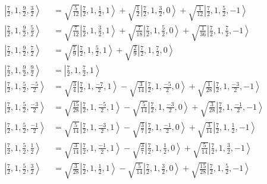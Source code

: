\documentclass{report}
\newcommand{\ket}[1]{\left| #1 \right>} %
\begin{document}
\begin{align*}
\ket{ \frac{7}{2} ,  1 ,  \frac{9}{2} ,  \frac{3}{2}  } &=  \sqrt{  \frac{5}{12}  } \ket{ \frac{7}{2} ,  1 ,  \frac{1}{2} ,  1  } + \sqrt{  \frac{1}{2}  } \ket{ \frac{7}{2} ,  1 ,  \frac{3}{2} ,  0  } + \sqrt{  \frac{1}{12}  } \ket{ \frac{7}{2} ,  1 ,  \frac{5}{2} ,  -1  } \\
\ket{ \frac{7}{2} ,  1 ,  \frac{9}{2} ,  \frac{5}{2}  } &=  \sqrt{  \frac{7}{12}  } \ket{ \frac{7}{2} ,  1 ,  \frac{3}{2} ,  1  } + \sqrt{  \frac{7}{18}  } \ket{ \frac{7}{2} ,  1 ,  \frac{5}{2} ,  0  } + \sqrt{  \frac{1}{36}  } \ket{ \frac{7}{2} ,  1 ,  \frac{7}{2} ,  -1  } \\
\ket{ \frac{7}{2} ,  1 ,  \frac{9}{2} ,  \frac{7}{2}  } &=  \sqrt{  \frac{7}{9}  } \ket{ \frac{7}{2} ,  1 ,  \frac{5}{2} ,  1  } + \sqrt{  \frac{2}{9}  } \ket{ \frac{7}{2} ,  1 ,  \frac{7}{2} ,  0  } \\
\ket{ \frac{7}{2} ,  1 ,  \frac{9}{2} ,  \frac{9}{2}  } &=  \ket{ \frac{7}{2} ,  1 ,  \frac{7}{2} ,  1  } \\
\ket{ \frac{7}{2} ,  1 ,  \frac{5}{2} ,  \frac{-5}{2}  } &=  \sqrt{  \frac{3}{4}  } \ket{ \frac{7}{2} ,  1 ,  \frac{-7}{2} ,  1  } - \sqrt{  \frac{3}{14}  } \ket{ \frac{7}{2} ,  1 ,  \frac{-5}{2} ,  0  } + \sqrt{  \frac{1}{28}  } \ket{ \frac{7}{2} ,  1 ,  \frac{-3}{2} ,  -1  } \\
\ket{ \frac{7}{2} ,  1 ,  \frac{5}{2} ,  \frac{-3}{2}  } &=  \sqrt{  \frac{15}{28}  } \ket{ \frac{7}{2} ,  1 ,  \frac{-5}{2} ,  1  } - \sqrt{  \frac{5}{14}  } \ket{ \frac{7}{2} ,  1 ,  \frac{-3}{2} ,  0  } + \sqrt{  \frac{3}{28}  } \ket{ \frac{7}{2} ,  1 ,  \frac{-1}{2} ,  -1  } \\
\ket{ \frac{7}{2} ,  1 ,  \frac{5}{2} ,  \frac{-1}{2}  } &=  \sqrt{  \frac{5}{14}  } \ket{ \frac{7}{2} ,  1 ,  \frac{-3}{2} ,  1  } - \sqrt{  \frac{3}{7}  } \ket{ \frac{7}{2} ,  1 ,  \frac{-1}{2} ,  0  } + \sqrt{  \frac{3}{14}  } \ket{ \frac{7}{2} ,  1 ,  \frac{1}{2} ,  -1  } \\
\ket{ \frac{7}{2} ,  1 ,  \frac{5}{2} ,  \frac{1}{2}  } &=  \sqrt{  \frac{3}{14}  } \ket{ \frac{7}{2} ,  1 ,  \frac{-1}{2} ,  1  } - \sqrt{  \frac{3}{7}  } \ket{ \frac{7}{2} ,  1 ,  \frac{1}{2} ,  0  } + \sqrt{  \frac{5}{14}  } \ket{ \frac{7}{2} ,  1 ,  \frac{3}{2} ,  -1  } \\
\ket{ \frac{7}{2} ,  1 ,  \frac{5}{2} ,  \frac{3}{2}  } &=  \sqrt{  \frac{3}{28}  } \ket{ \frac{7}{2} ,  1 ,  \frac{1}{2} ,  1  } - \sqrt{  \frac{5}{14}  } \ket{ \frac{7}{2} ,  1 ,  \frac{3}{2} ,  0  } + \sqrt{  \frac{15}{28}  } \ket{ \frac{7}{2} ,  1 ,  \frac{5}{2} ,  -1  } \\

\end{align*}
\end{document}
